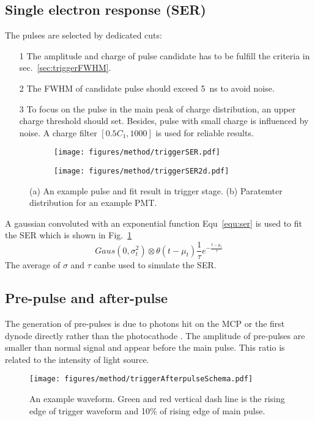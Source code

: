 \subsection{Single electron response (SER)}
The pulses are selected by dedicated cuts:
\begin{itemize}
    \item[1] The amplitude and charge of pulse candidate has to be fulfill the criteria in sec.~\ref{sec:triggerFWHM}.
    \item[2] The FWHM of candidate pulse should exceed \SI{5}{ns} to avoid noise.
    \item[3] To focus on the pulse in the main peak of charge distribution, an upper charge threshold should set. Besides, pulse with small charge is influenced by noise. A charge filter $[0.5C_1, 1000]$ is used for reliable results.
\end{itemize}

\begin{figure}
    \centering
    \begin{subfigure}[t]{0.47\textwidth}
        \texttt{[image: figures/method/triggerSER.pdf]}
        \caption{}
        \label{fig:triggerser}
    \end{subfigure}
    \begin{subfigure}[t]{0.47\textwidth}
        \texttt{[image: figures/method/triggerSER2d.pdf]}
        \caption{}
        \label{fig:triggerser2d}
    \end{subfigure}
    \caption{(a) An example pulse and fit result in trigger stage. (b) Paratemter distribution for an example PMT.}
\end{figure}

A gaussian convoluted with an exponential function Equ~\eqref{equ:ser} is used to fit the SER which is shown in Fig.~\ref{fig:triggerser}
\begin{equation}
    \label{equ:ser}
    Gaus(0,\sigma_t^2)\otimes\theta(t-\mu_t)\frac{1}{\tau}e^{-\frac{t-\mu_t}{\tau}}
\end{equation}
The average of $\sigma$ and $\tau$ canbe used to simulate the SER. 
\subsection{Pre-pulse and after-pulse}
The generation of pre-pulses is due to photons hit on the MCP or the first dynode directly rather than the photocathode \cite{JUNOMassTesting}. The amplitude of pre-pulses are smaller than normal signal and appear before the main pulse. This ratio is related to the intensity of light source.
\begin{figure}
    \centering
    \texttt{[image: figures/method/triggerAfterpulseSchema.pdf]}
    \caption{An example waveform. Green and red vertical dash line is the rising edge of trigger waveform and 10\% of rising edge of main pulse.}
    \label{fig:afterpulseSchema}
\end{figure}

